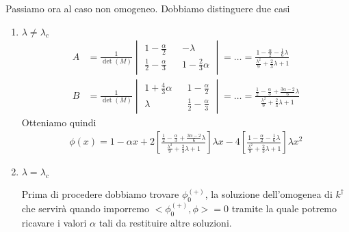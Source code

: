 Passiamo ora al caso non omogeneo. Dobbiamo distinguere due casi
\begin{enumerate}
	\item  $\lambda \neq \lambda_c$
		\begin{align}
			A &= \frac{1}{\det (M)} \begin{vmatrix} 
	1 - \frac{\alpha}{2} && -\lambda \\
	\frac{1}{2} - \frac{\alpha}{3} && 1 - \frac{2}{3}\alpha		
	\end{vmatrix} = \dots = \frac{1 - \frac{\alpha}{2} - \frac{1}{6} \lambda}{\frac{\lambda^2}{9} + \frac{2}{3}\lambda + 1} \\
	B &= \frac{1}{\det (M)} \begin{vmatrix} 
	1 + \frac{4}{3}\alpha && 1 - \frac{\alpha}{2} \\
	\lambda && \frac{1}{2} - \frac{\alpha}{3}		
	\end{vmatrix} = \dots = \frac{\frac{1}{2} - \frac{\alpha}{3} + \frac{3\alpha -2}{6} \lambda}{\frac{\lambda^2}{9} + \frac{2}{3}\lambda + 1}	
	\end{align}
	Otteniamo quindi
	\begin{align}
		\phi(x) = 1 -\alpha x + 2 \left[ \frac{\frac{1}{2} - \frac{\alpha}{3} + \frac{3\alpha -2}{6} \lambda}{\frac{\lambda^2}{9} + \frac{2}{3}\lambda + 1} \right] \lambda x - 4 \left[ \frac{1 - \frac{\alpha}{2} - \frac{1}{6} \lambda}{\frac{\lambda^2}{9} + \frac{2}{3}\lambda + 1} \right] \lambda x^2
	\end{align}

	\item  $\lambda = \lambda_c$
	
	Prima di procedere dobbiamo trovare $\phi_0^{(+)}$, la soluzione dell'omogenea di $k^\dagger$ che servirà quando imporremo $<\phi_0^{(+)}, \phi> = 0$ tramite la quale potremo ricavare i valori $\alpha$ tali da restituire altre soluzioni. 
	

\end{enumerate}
